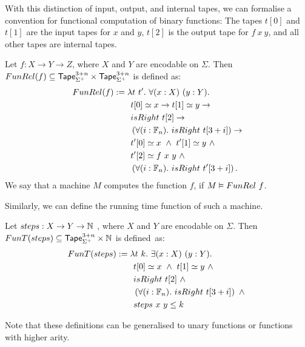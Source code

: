 With this distinction of input, output, and internal tapes, we can formalise a convention for functional computation of binary functions: The tapes
$t[0]$ and $t[1]$ are the input tapes for $x$ and $y$, $t[2]$ is the output tape for $f~x~y$, and all other tapes are internal tapes.
\begin{definition}
  \label{def:Computes2_Rel}
  Let $f : X \to Y \to Z$, where $X$ and $Y$ are encodable on $\Sigma$.  Then
  $FunRel(f) \subseteq \mathsf{Tape}_{\Sigma^+}^{3+n} \times \mathsf{Tape}_{\Sigma^+}^{3+n}$ is defined as:
  \begin{alignat*}{2}
     FunRel(f) &:= \lambda t~t'.~\forall (x:X)~(y:Y). \\
    &\qquad t[0] \simeq x \rightarrow t[1] \simeq y \rightarrow \\
    &\qquad isRight~t[2] \rightarrow \\
    &\qquad \left(\forall (i:\mathbb{F}_n).~isRight~t[3+i] \right) \rightarrow \\
    &\qquad t'[0] \simeq x ~\land~ t'[1] \simeq y ~\land~ \\
    &\qquad t'[2] \simeq f~x~y ~\land~ \\
    &\qquad \left(\forall (i:\mathbb{F}_n).~isRight~t'[3+i] \right).
  \end{alignat*}
  We say that a machine $M$ computes the function $f$, if $M \mathrel{\vDash} FunRel~f$.
\end{definition}

Similarly, we can define the running time function of such a machine.
\begin{definition}
  \label{def:Computes2_T}
  Let $steps : X \rightarrow Y \rightarrow \mathbb{N}$ , where $X$ and $Y$ are encodable on $\Sigma$.  Then $FunT(steps) \subseteq \mathsf{Tape}_{\Sigma^+}^{3+n} \times \mathbb{N}$ is
  defined~as:
  \begin{alignat*}{2}
     FunT(steps) &:= \lambda t~k.~\exists (x:X)~(y:Y). \\
    &\qquad t[0] \simeq x ~\land~ t[1] \simeq y ~\land~ \\
    &\qquad isRight~t[2] ~\land~ \\
    &\qquad \left(\forall (i:\mathbb{F}_n).~isRight~t[3+i] \right) ~\land~ \\
    &\qquad steps~x~y \leq k
  \end{alignat*}
\end{definition}

Note that these definitions can be generalised to unary functions or functions with higher arity.

